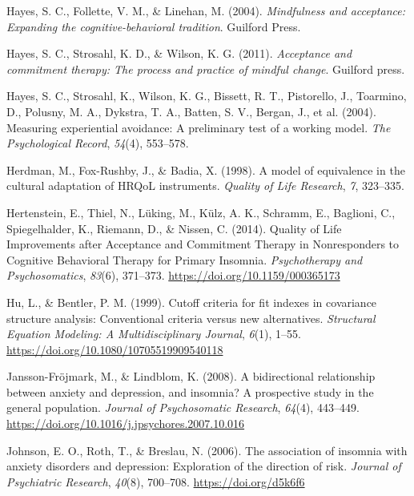 \documentclass[
  ,doc,11pt, twoside,floatsintext]{apa6}
\newlength{\cslhangindent}
\newlength{\cslentryspacingunit} %
\newenvironment{CSLReferences}[2] %
 {%
  \setlength{\parindent}{0pt}
  \ifodd #1
  \let\oldpar\par
  \def\par{\hangindent=\cslhangindent\oldpar}
  \fi
  \setlength{\parskip}{#2\cslentryspacingunit}
 }%
 {}
\begin{document}
\begin{CSLReferences}{1}{0}
\leavevmode{}%
Hayes, S. C., Follette, V. M., \& Linehan, M. (2004). \emph{Mindfulness and acceptance: Expanding the cognitive-behavioral tradition}. Guilford Press.

\leavevmode{}%
Hayes, S. C., Strosahl, K. D., \& Wilson, K. G. (2011). \emph{Acceptance and commitment therapy: The process and practice of mindful change}. Guilford press.

\leavevmode{}%
Hayes, S. C., Strosahl, K., Wilson, K. G., Bissett, R. T., Pistorello, J., Toarmino, D., Polusny, M. A., Dykstra, T. A., Batten, S. V., Bergan, J., et al. (2004). Measuring experiential avoidance: A preliminary test of a working model. \emph{The Psychological Record}, \emph{54}(4), 553--578.

\leavevmode{}%
Herdman, M., Fox-Rushby, J., \& Badia, X. (1998). A model of equivalence in the cultural adaptation of {HRQoL} instruments. \emph{Quality of Life Research}, \emph{7}, 323--335.

\leavevmode{}%
Hertenstein, E., Thiel, N., Lüking, M., Külz, A. K., Schramm, E., Baglioni, C., Spiegelhalder, K., Riemann, D., \& Nissen, C. (2014). Quality of {Life Improvements} after {Acceptance} and {Commitment Therapy} in {Nonresponders} to {Cognitive Behavioral Therapy} for {Primary Insomnia}. \emph{Psychotherapy and Psychosomatics}, \emph{83}(6), 371--373. \url{https://doi.org/10.1159/000365173}

\leavevmode{}%
Hu, L., \& Bentler, P. M. (1999). Cutoff criteria for fit indexes in covariance structure analysis: {Conventional} criteria versus new alternatives. \emph{Structural Equation Modeling: A Multidisciplinary Journal}, \emph{6}(1), 1--55. \url{https://doi.org/10.1080/10705519909540118}

\leavevmode{}%
Jansson-Fröjmark, M., \& Lindblom, K. (2008). A bidirectional relationship between anxiety and depression, and insomnia? {A} prospective study in the general population. \emph{Journal of Psychosomatic Research}, \emph{64}(4), 443--449. \url{https://doi.org/10.1016/j.jpsychores.2007.10.016}

\leavevmode{}%
Johnson, E. O., Roth, T., \& Breslau, N. (2006). The association of insomnia with anxiety disorders and depression: Exploration of the direction of risk. \emph{Journal of Psychiatric Research}, \emph{40}(8), 700--708. \url{https://doi.org/d5k6f6}


\end{CSLReferences}
\end{document}
